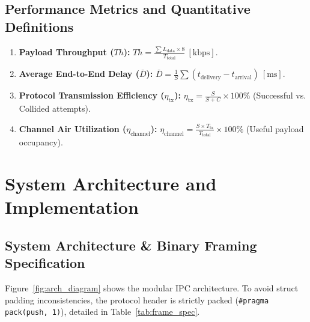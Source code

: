 \documentclass[11pt,a4paper]{article}
\begin{document}
\subsection{Performance Metrics and Quantitative Definitions}
\begin{enumerate}
    \item \textbf{Payload Throughput ($Th$):} $Th = \frac{\sum L_{\text{data}} \times 8}{T_{\text{total}}}\ [\text{kbps}]$.
    \item \textbf{Average End-to-End Delay ($\bar{D}$):} $\bar{D} = \frac{1}{S} \sum (t_{\text{delivery}} - t_{\text{arrival}})\ [\text{ms}]$.
    \item \textbf{Protocol Transmission Efficiency ($\eta_{\text{tx}}$):} $\eta_{\text{tx}} = \frac{S}{S + C} \times 100\%$ (Successful vs. Collided attempts).
    \item \textbf{Channel Air Utilization ($\eta_{\text{channel}}$):} $\eta_{\text{channel}} = \frac{S \times T_{\text{tx}}}{T_{\text{total}}} \times 100\%$ (Useful payload occupancy).
\end{enumerate}

\newpage

\section{System Architecture and Implementation}

\subsection{System Architecture \& Binary Framing Specification}
Figure~\ref{fig:arch_diagram} shows the modular IPC architecture. To avoid struct padding inconsistencies, the protocol header is strictly packed (\texttt{\#pragma pack(push, 1)}), detailed in Table~\ref{tab:frame_spec}.
\end{document}
